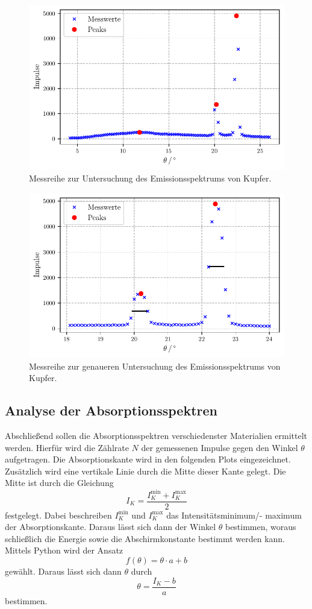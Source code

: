 \begin{figure}
  \centering
  \includegraphics[width=0.5 \linewidth]{build/kupfer1.pdf}
  \caption{Messreihe zur Untersuchung des Emissionsspektrums von Kupfer.}
  \label{fig:kupfer1}
\end{figure}

\begin{figure}
  \centering
  \includegraphics[width=0.5 \linewidth]{build/kupfer2.pdf}
  \caption{ Messreihe zur genaueren Untersuchung des Emissionsspektrums von Kupfer.}
  \label{fig:kupfer2}
\end{figure}

\subsection{Analyse der Absorptionsspektren}

Abschließend sollen die Absorptionsspektren verschiedenster Materialien ermittelt werden.
Hierfür wird die Zählrate $N$ der gemessenen Impulse gegen den Winkel $\theta$ aufgetragen.
Die Absorptionskante wird in den folgenden Plots eingezeichnet.
Zusätzlich wird eine vertikale Linie durch die Mitte dieser Kante gelegt.
Die Mitte ist durch die Gleichung
\begin{equation*}
  I_K = \frac{I_K^\text{min} + I_K^\text{max}}{2}
\end{equation*}
festgelegt. Dabei beschreiben $I_K^\text{min}$ und $I_K^\text{max}$ das Intensitätsminimum/- maximum der Absorptionskante.
Daraus lässt sich dann der Winkel $\theta$ bestimmen, woraus schließlich die Energie sowie die Abschirmkonstante bestimmt werden kann.
Mittels Python wird der Ansatz
\begin{equation}
  f(\theta) = \theta \cdot a + b
\end{equation}
gewählt.
Daraus lässt sich dann $\theta$ durch
\begin{equation}
  \theta = \frac{I_K - b}{a}
\end{equation}
bestimmen.

